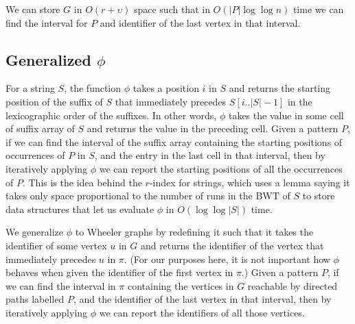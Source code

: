 \begin{lemma}
\label{lem:toehold}
We can store $G$ in $O (r + \upsilon)$ space such that in $O (|P| \log \log n)$ time we can find the interval for $P$ and identifier of the last vertex in that interval.
\end{lemma} 

\subsection{Generalized \texorpdfstring{$\phi$}{TEXT}}
\label{subsec:phi}

For a string $S$, the function $\phi$ takes a position $i$ in $S$ and returns the starting position of the suffix of $S$ that immediately precedes $S [i..|S| - 1]$ in the lexicographic order of the suffixes.  In other words, $\phi$ takes the value in some cell of suffix array of $S$ and returns the value in the preceding cell.  Given a pattern $P$, if we can find the interval of the suffix array containing the starting positions of occurrences of $P$ in $S$, and the entry in the last cell in that interval, then by iteratively applying $\phi$ we can report the starting positions of all the occurrences of $P$.  This is the idea behind the $r$-index for strings, which uses a lemma saying it takes only space proportional to the number of runs in the BWT of $S$ to store data structures that let us evaluate $\phi$ in $O (\log \log |S|)$ time.

We generalize $\phi$ to Wheeler graphs by redefining it such that it takes the identifier of some vertex $u$ in $G$ and returns the identifier of the vertex that immediately precedes $u$ in $\pi$.  (For our purposes here, it is not important how $\phi$ behaves when given the identifier of the first vertex in $\pi$.)  Given a pattern $P$, if we can find the interval in $\pi$ containing the vertices in $G$ reachable by directed paths labelled $P$, and the identifier of the last vertex in that interval, then by iteratively applying $\phi$ we can report the identifiers of all those vertices.

